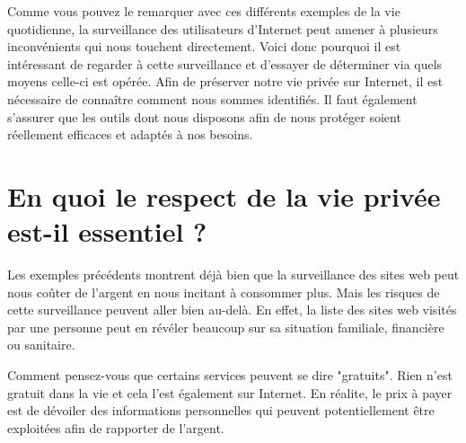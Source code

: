 Comme vous pouvez le remarquer avec ces différents exemples de la vie quotidienne, la surveillance des utilisateurs d'Internet peut amener à plusieurs inconvénients qui nous touchent directement. Voici donc pourquoi il est intéressant de regarder à cette surveillance et d'essayer de déterminer via quels moyens celle-ci est opérée. Afin de préserver notre vie privée sur Internet, il est nécessaire de connaître comment nous sommes identifiés. Il faut également s'assurer que les outils dont nous disposons afin de nous protéger soient réellement efficaces et adaptés à nos besoins.


\section{En quoi le respect de la vie privée est-il essentiel ?}
Les exemples précédents montrent déjà bien que la surveillance des sites web peut nous coûter de l'argent en nous incitant à consommer plus. Mais les risques de cette surveillance peuvent aller bien au-delà. En effet, la liste des sites web visités par une personne peut en révéler beaucoup sur sa situation familiale, financière ou sanitaire.
\newline

Comment pensez-vous que certains services peuvent se dire "gratuits". Rien n'est gratuit dans la vie et cela l'est également sur Internet. En réalite, le prix à payer est de dévoiler des informations personnelles qui peuvent potentiellement être exploitées afin de rapporter de l'argent.
\newline


